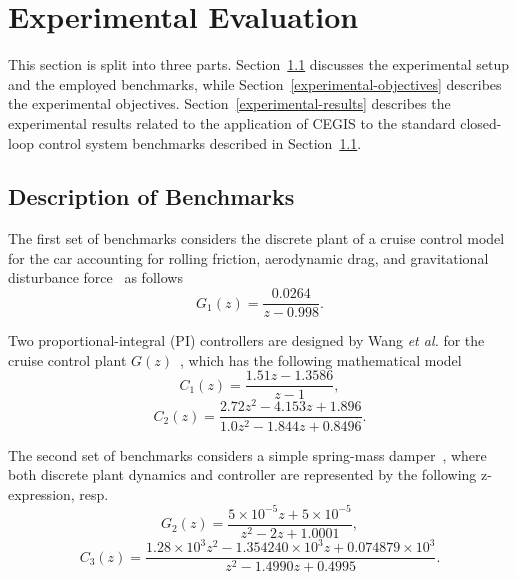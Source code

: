 \documentclass{sig-alternate-05-2015}
\begin{document}
\section{Experimental Evaluation} \label{sec:experiments}

This section is split into three parts. Section~\ref{experimental-setup}
discusses the experimental setup and the employed benchmarks, while
Section~\ref{experimental-objectives} describes the experimental objectives. 
Section~\ref{experimental-results} describes the experimental results
related to the application of CEGIS to the standard closed-loop control
system benchmarks described in Section~\ref{experimental-setup}.

\subsection{Description of Benchmarks}
\label{experimental-setup}

The first set of benchmarks considers the discrete plant of a cruise 
control model for the car accounting for rolling friction, aerodynamic drag, 
and gravitational disturbance force~\cite{Astrom08} as follows
%
\begin{equation}
\label{cruise-control-c1}
G_1(z)=\frac{0.0264}{z-0.998}. \nonumber
\end{equation} 

Two proportional-integral (PI) controllers are designed by Wang {\it et al.} 
for the cruise control plant $G(z)$~\cite{DBLP:conf/hybrid/WangGRJF16}, 
which has the following mathematical model
%
\begin{equation}
\label{cruise-control-g1}
C_{1}(z)=\frac{1.51z-1.3586}{z-1}, \nonumber
\end{equation} 
%
\begin{equation}
\label{cruise-control-g2}
C_{2}(z)=\frac{2.72z^2 - 4.153z + 1.896}{1.0z^2 - 1.844z + 0.8496}. \nonumber
\end{equation} 

The second set of benchmarks considers a simple spring-mass 
damper~\cite{DBLP:conf/hybrid/WangGRJF16}, where both discrete 
plant dynamics and controller are represented by the following 
z-expression, resp.
%
\begin{equation}
\label{spring-mass-damper-g}
G_2(z)=\frac{5\times{10^{-5}}z + 5\times{10^{-5}}}{z^2 - 2z + 1.0001}, \nonumber
\end{equation} 
%
\begin{equation}
\label{spring-mass-damper-c}
C_3(z)=\frac{1.28\times{10^{3}}z^2 - 1.354240\times{10^{3}}z + 0.074879\times{10^{3}}}{z^2 - 1.4990z + 0.4995}. \nonumber
\end{equation} 
\end{document}
